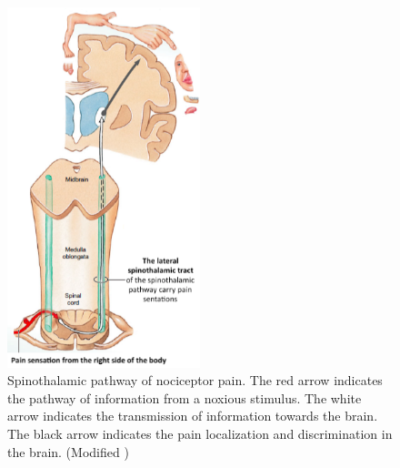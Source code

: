 \begin{figure}[H]
	\includegraphics[width=0.5\textwidth]{figures/pathways.png} 
	\caption{Spinothalamic pathway of nociceptor pain. The red arrow indicates the pathway of information from a noxious stimulus. The white arrow indicates the transmission of information towards the brain. The black arrow indicates the pain localization and discrimination in the brain. (Modified \cite{Martini2012})}
	\label{fig:pathways}  
\end{figure}   




